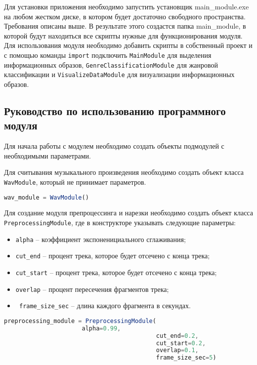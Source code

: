 Для установки приложения необходимо запустить установщик main\_module.exe на любом жестком диске, в котором будет достаточно свободного пространства. Требования описаны выше. В результате этого создастся папка  main\_module, в которой будут находиться все скрипты нужные для функционирования модуля. Для использования модуля необходимо добавить скрипты в собственный проект и с помощью команды \texttt{import} подключить \texttt{MainModule} для выделения информационных образов, \texttt{GenreClassificationModule} для жанровой классификации и  \texttt{VisualizeDataModule} для визуализации информационных образов.

\subsection{Руководство по использованию программного модуля}
\label{sub:manual:us}

Для начала работы с модулем необходимо создать объекты подмодулей с необходимыми параметрами. 

Для считывания музыкального произведения необходимо создать объект класса \texttt{WavModule}, который не принимает параметров.

\begin{lstlisting}[language=TypeScript, label=lst:testing:results]
	wav_module = WavModule()
\end{lstlisting}

Для создание модуля препроцессинга и нарезки необходимо создать объект класса \texttt{PreprocessingModule}, где в конструкторе указывать следующие параметры:
\begin{itemize} 
\item \texttt{alpha} -- коэффициент экспоненициального сглаживания;
\item \texttt{cut\_end} -- процент трека, которое будет отсечено с конца трека;
\item \texttt{cut\_start} -- процент трека, которое будет отсечено с конца трека;
\item \texttt{overlap} -- процент пересечения фрагментов трека;
\item \texttt{ frame\_size\_sec} -- длина каждого фрагмента в секундах.
\end{itemize}

\begin{lstlisting}[language=TypeScript, label=lst:testing:results]
	preprocessing_module = PreprocessingModule(
					  alpha=0.99,
                                           cut_end=0.2,
                                           cut_start=0.2,
                                           overlap=0.1,
                                           frame_size_sec=5)
\end{lstlisting}

